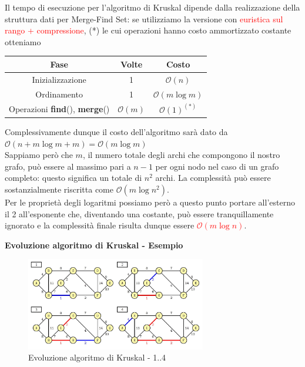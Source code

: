 \documentclass[../cheatSheetAlgoritmi.tex]{subfiles}
\begin{document}
Il tempo di esecuzione per l'algoritmo di Kruskal dipende dalla realizzazione della struttura dati per Merge-Find Set: se utilizziamo la versione con \textcolor{red}{euristica sul rango + compressione}, (*) le cui operazioni hanno costo ammortizzato costante otteniamo
\begin{center}
	\renewcommand{\arraystretch}{1.2}
	\begin{tabular}{ |c|c|c| } 
		\hline
			\textbf{Fase} & \textbf{Volte} & \textbf{Costo}\\ 
		\hline
			Inizializzazione & 1 &  $\mathcal{O}(n)$\\ 
		\hline
			Ordinamento & 1 &  $\mathcal{O}(m \log m)$ \\
		\hline
			Operazioni \textbf{find}(), \textbf{merge}() & $\mathcal{O}(m)$ & $\mathcal{O}(1)^{(*)}$\\
		\hline
	\end{tabular}
\end{center}
Complessivamente dunque il costo dell'algoritmo sarà dato da $\mathcal{O}(n + m \log m + m) = \mathcal{O}(m \log m)$\\
Sappiamo però che $m$, il numero totale degli archi che compongono il nostro grafo, può essere al massimo pari a $n-1$ per ogni nodo nel caso di un grafo completo: questo significa un totale di $n^{2}$ archi. La complessità può essere sostanzialmente riscritta come $\mathcal{O}(m \log n^{2})$.\\
Per le proprietà degli logaritmi possiamo però a questo punto portare all'esterno il 2 all'esponente che, diventando una costante, può essere tranquillamente ignorato e la complessità finale risulta dunque essere \textcolor{red}{$\mathcal{O}(m \log n)$}.
\newpage
\begin{flushleft}
\textbf{Evoluzione algoritmo di Kruskal - Esempio}
\end{flushleft}
\begin{figure}[h]
	\centering
	\includegraphics[width=0.7\textwidth]{../img/Greedy_7.jpg}
	\caption{Evoluzione algoritmo di Kruskal - 1..4}
\end{figure}
\end{document}
